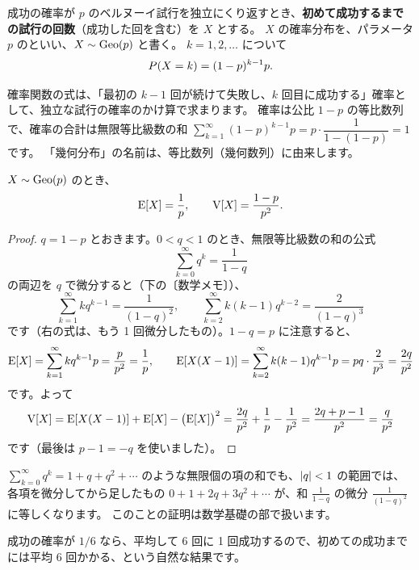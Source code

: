 \begin{definition}
  成功の確率が $p$ のベルヌーイ試行を独立にくり返すとき、\textbf{初めて成功するまでの試行の回数}（成功した回を含む）を $X$ とする。
  $X$ の確率分布を、パラメータ $p$ のといい、$X \sim \mathrm{Geo}(p)$ と書く。
  $k = 1, 2, \dots$ について
  \[
    P(X = k) = (1 - p)^{k-1} p.
  \]
\end{definition}

確率関数の式は、「最初の $k - 1$ 回が続けて失敗し、$k$ 回目に成功する」確率として、独立な試行の確率のかけ算で求まります。
確率は公比 $1 - p$ の等比数列で、確率の合計は無限等比級数の和 $\sum_{k=1}^{\infty} (1-p)^{k-1} p = p \cdot \dfrac{1}{1 - (1 - p)} = 1$ です。
「幾何分布」の名前は、等比数列（幾何数列）に由来します。

\begin{theorem}
  $X \sim \mathrm{Geo}(p)$ のとき、
  \[
    \mathrm{E}[X] = \frac{1}{p}, \qquad \mathrm{V}[X] = \frac{1 - p}{p^2}.
  \]
\end{theorem}

\begin{proof}
  $q = 1 - p$ とおきます。$0 < q < 1$ のとき、無限等比級数の和の公式
  \[
    \sum_{k=0}^{\infty} q^k = \frac{1}{1 - q}
  \]
  の両辺を $q$ で微分すると（下の〔数学メモ〕）、
  \[
    \sum_{k=1}^{\infty} k q^{k-1} = \frac{1}{(1 - q)^2}, \qquad
    \sum_{k=2}^{\infty} k(k-1) q^{k-2} = \frac{2}{(1 - q)^3}
  \]
  です（右の式は、もう 1 回微分したもの）。$1 - q = p$ に注意すると、
  \[
    \mathrm{E}[X] = \sum_{k=1}^{\infty} k q^{k-1} p = \frac{p}{p^2} = \frac{1}{p}, \qquad
    \mathrm{E}[X(X-1)] = \sum_{k=2}^{\infty} k(k-1) q^{k-1} p = pq \cdot \frac{2}{p^3} = \frac{2q}{p^2}
  \]
  です。よって
  \[
    \mathrm{V}[X] = \mathrm{E}[X(X-1)] + \mathrm{E}[X] - \bigl(\mathrm{E}[X]\bigr)^2 = \frac{2q}{p^2} + \frac{1}{p} - \frac{1}{p^2} = \frac{2q + p - 1}{p^2} = \frac{q}{p^2}
  \]
  です（最後は $p - 1 = -q$ を使いました）。
\end{proof}

\begin{mathnote}[級数を項ごとに微分する]
  $\sum_{k=0}^{\infty} q^k = 1 + q + q^2 + \cdots$ のような無限個の項の和でも、$\lvert q\rvert < 1$ の範囲では、
  各項を微分してから足したもの $0 + 1 + 2q + 3q^2 + \cdots$ が、和 $\frac{1}{1-q}$ の微分 $\frac{1}{(1-q)^2}$ に等しくなります。
  このことの証明は数学基礎の部で扱います。
\end{mathnote}

\begin{intuition}
  成功の確率が $1/6$ なら、平均して 6 回に 1 回成功するので、初めての成功までには平均 6 回かかる、という自然な結果です。
\end{intuition}


